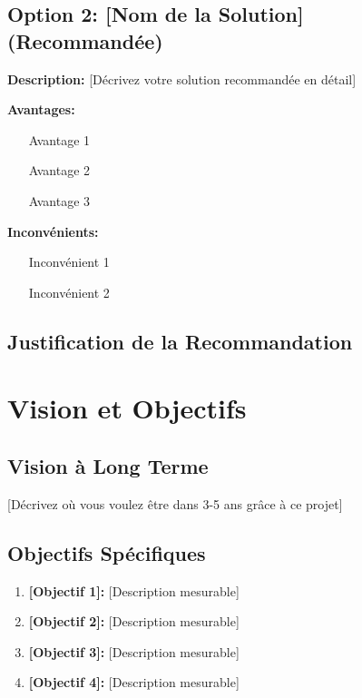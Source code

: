 \subsection{Option 2: [Nom de la Solution] (Recommandée)}

\textbf{Description:}
[Décrivez votre solution recommandée en détail]

\textbf{Avantages:}
\begin{itemize}
\item [Avantage 1]
\item [Avantage 2]
\item [Avantage 3]
\end{itemize}

\textbf{Inconvénients:}
\begin{itemize}
\item [Inconvénient 1]
\item [Inconvénient 2]
\end{itemize}

\subsection{Justification de la Recommandation}


\section{Vision et Objectifs}

\subsection{Vision à Long Terme}

[Décrivez où vous voulez être dans 3-5 ans grâce à ce projet]

\subsection{Objectifs Spécifiques}

\begin{enumerate}
\item \textbf{[Objectif 1]:} [Description mesurable]
\item \textbf{[Objectif 2]:} [Description mesurable]
\item \textbf{[Objectif 3]:} [Description mesurable]
\item \textbf{[Objectif 4]:} [Description mesurable]
\end{enumerate}

